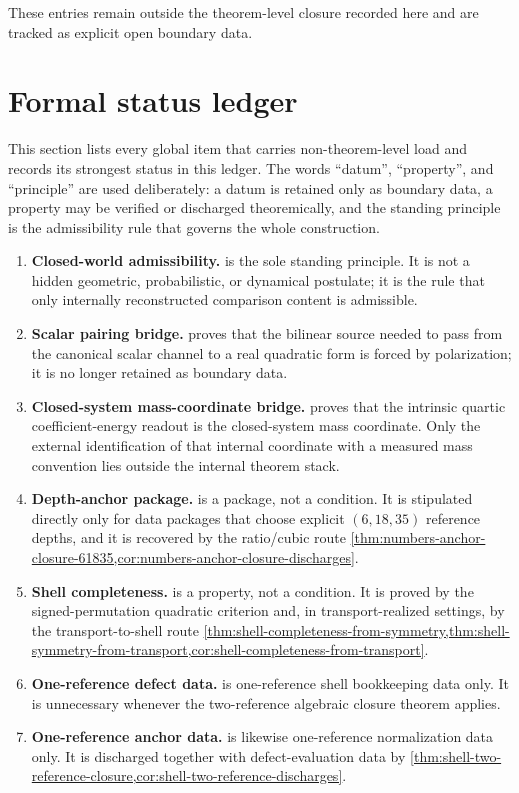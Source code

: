 These entries remain outside the theorem-level closure recorded here and are tracked as
explicit open boundary data.

\section{Formal status ledger}
\label{sec:cond-status-ledger}

This section lists every global item that carries non-theorem-level load and
records its strongest status in this ledger.
The words ``datum'', ``property'', and ``principle'' are used deliberately:
a datum is retained only as boundary data, a property may be verified or
discharged theoremically, and the standing principle is the admissibility rule
that governs the whole construction.

\begin{enumerate}[label=\textup{(H\arabic*)}]
\item
  \textbf{Closed-world admissibility.}
   is the sole standing principle.  It is not a hidden
  geometric, probabilistic, or dynamical postulate; it is the rule that only
  internally reconstructed comparison content is admissible.
\item
  \textbf{Scalar pairing bridge.}
   proves that the bilinear source needed to pass
  from the canonical scalar channel to a real quadratic form is forced by
  polarization; it is no longer retained as boundary data.
\item
  \textbf{Closed-system mass-coordinate bridge.}
   proves that the intrinsic quartic
  coefficient-energy readout is the closed-system mass coordinate.  Only the
  external identification of that internal coordinate with a measured mass
  convention lies outside the internal theorem stack.
\item
  \textbf{Depth-anchor package.}
   is a package, not a condition.  It is
  stipulated directly only for data packages that choose explicit \((6,18,35)\)
  reference depths, and it is recovered by the ratio/cubic route
  \cref{thm:numbers-anchor-closure-61835,cor:numbers-anchor-closure-discharges}.
\item
  \textbf{Shell completeness.}
   is a property, not a condition.  It is
  proved by the signed-permutation quadratic criterion and, in transport-realized settings,
  by the transport-to-shell route
  \cref{thm:shell-completeness-from-symmetry,thm:shell-symmetry-from-transport,cor:shell-completeness-from-transport}.
\item
  \textbf{One-reference defect data.}
   is one-reference shell bookkeeping
  data only.  It is unnecessary whenever the two-reference algebraic
  closure theorem applies.
\item
  \textbf{One-reference anchor data.}
   is likewise one-reference normalization data
  only.  It is discharged together with defect-evaluation data by
  \cref{thm:shell-two-reference-closure,cor:shell-two-reference-discharges}.
\end{enumerate}

